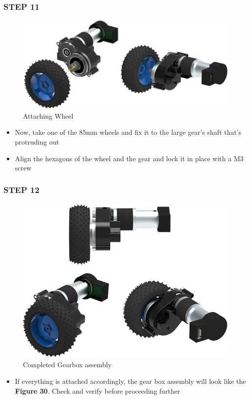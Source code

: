 \documentclass[12pt,a4paper,oneside]{book}
\begin{document}
			\subsubsection*{STEP 11}
				\begin{figure}[H]
					\begin{center}
						\includegraphics[scale=0.6]{ATTACHING WHEEL}
						\caption{Attaching Wheel}
					\end{center}
				\end{figure}
				\begin{itemize}
					\item Now, take one of the 85mm wheels and fix it to the large gear's shaft that's protruding out 
					\item Align the hexagons of the wheel and the gear and lock it in place with a M3 screw
				\end{itemize}
				
			\subsubsection*{STEP 12}
				\begin{figure}[H]
					\begin{center}
						\includegraphics[scale=0.6]{AFTER WHEELS ATTACHED}
						\caption{Completed Gearbox assembly}
					\end{center}
				\end{figure}
				\begin{itemize}
					\item If everything is attached accordingly, the gear box assembly will look like the \textbf{Figure 30}. Check and verify before proceeding further
					
				\end{itemize}
\end{document}
